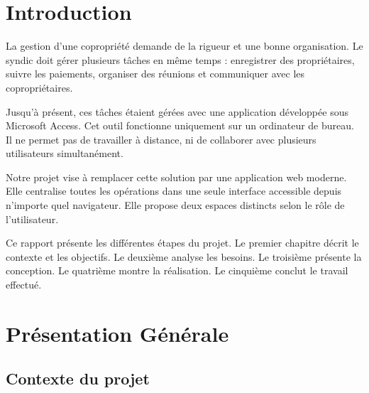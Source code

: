 \documentclass[12pt, a4paper]{report}
\newcommand{\prechapter}[1]{%
  \chapter*{#1}%
  \addcontentsline{toc}{chapter}{#1}%
  \thispagestyle{fancy}%
}
\begin{document}
\tableofcontents
\thispagestyle{fancy}

\listoffigures
{}
\thispagestyle{fancy}

\prechapter{Introduction}

La gestion d'une copropriété demande de la rigueur et une bonne organisation. Le syndic doit gérer plusieurs tâches en même temps : enregistrer des propriétaires, suivre les paiements, organiser des réunions et communiquer avec les copropriétaires.

Jusqu'à présent, ces tâches étaient gérées avec une application développée sous Microsoft Access. Cet outil fonctionne uniquement sur un ordinateur de bureau. Il ne permet pas de travailler à distance, ni de collaborer avec plusieurs utilisateurs simultanément.

Notre projet vise à remplacer cette solution par une application web moderne. Elle centralise toutes les opérations dans une seule interface accessible depuis n'importe quel navigateur. Elle propose deux espaces distincts selon le rôle de l'utilisateur.

Ce rapport présente les différentes étapes du projet. Le premier chapitre décrit le contexte et les objectifs. Le deuxième analyse les besoins. Le troisième présente la conception. Le quatrième montre la réalisation. Le cinquième conclut le travail effectué.

\chapter{Présentation Générale}

\section{Contexte du projet}
\end{document}
